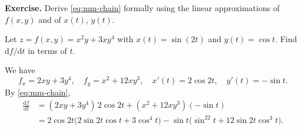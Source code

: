 \textbf{Exercise.} Derive \eqref{eq:mm-chain} formally using the linear
approximations of $f(x,y)$ and of $x(t)$, $y(t)$.

\begin{example}
Let $z=f(x,y)=x^2y+3xy^4$ with $x(t)=\sin(2t)$ and $y(t)=\cos t$.
Find $\mathrm df/\mathrm dt$ in terms of $t$.

We have
\[
 f_x=2xy+3y^4,\quad f_y=x^2+12xy^3,\quad x'(t)=2\cos2t,\quad y'(t)=-\sin t.
\]
By \eqref{eq:mm-chain},
\begin{align*}
 \frac{\mathrm df}{\mathrm dt}
 &=(2xy+3y^4)\,2\cos2t+(x^2+12xy^3)(-\sin t)\\
 &=2\cos2t\bigl(2\sin2t\cos t+3\cos^4t\bigr)
   -\sin t\bigl(\sin^22t+12\sin2t\cos^3t\bigr).
\end{align*}
\end{example}


